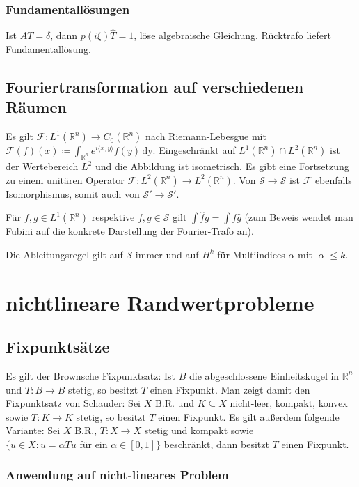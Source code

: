 \documentclass[11pt,a4paper]{scrartcl}
\newcommand{\R}{\mathbb{R}} %
\newcommand{\Sc}{\mathcal{S}}
\newcommand{\F}{\mathcal{F}}
\theoremstyle{plain}
\theoremstyle{definition}
\theoremstyle{remark}
\begin{document}
\subsubsection{Fundamentallösungen}

Ist $AT=\delta$, dann $p(i\xi)\hat T = 1$, löse algebraische Gleichung. Rücktrafo liefert Fundamentallösung.

\subsection{Fouriertransformation auf verschiedenen Räumen}

Es gilt $\F: L^1(\R^n) \to C_0(\R^n)$ nach Riemann-Lebesgue mit $\F(f)(x)\coloneqq \int_{\R^n} e^{i\langle x,y \rangle}f(y) \, \mathrm{dy}$. Eingeschränkt auf $L^1(\R^n) \cap L^2(\R^n)$ ist der Wertebereich $L^2$ und die Abbildung ist isometrisch. Es gibt eine Fortsetzung zu einem unitären Operator $\F: L^2(\R^n)\to L^2(\R^n)$. Von $\Sc\to \Sc$ ist $\F$ ebenfalls Isomorphismus, somit auch von $\Sc'\to \Sc'$.

Für $f,g\in L^1(\R^n)$ respektive $f,g\in \Sc$ gilt $\int \hat f g = \int f \hat g$ (zum Beweis wendet man Fubini auf die konkrete Darstellung der Fourier-Trafo an).

Die Ableitungsregel gilt auf $\Sc$ immer und auf $H^k$ für Multiindices $\alpha$ mit $|\alpha| \leq k$.

\section{nichtlineare Randwertprobleme}

\subsection{Fixpunktsätze}

Es gilt der Brownsche Fixpunktsatz: Ist $B$ die abgeschlossene Einheitskugel in $\R^n$ und $T:B\to B$ stetig, so besitzt $T$ einen Fixpunkt. Man zeigt damit den Fixpunktsatz von Schauder: Sei $X$ B.R. und $K\subseteq X$ nicht-leer, kompakt, konvex sowie $T:K\to K$ stetig, so besitzt $T$ einen Fixpunkt. Es gilt außerdem folgende Variante: Sei $X$ B.R., $T:X\to X$ stetig und kompakt sowie $\{ u\in X: u = \alpha Tu \text{ für ein } \alpha \in [0,1]\}$ beschränkt, dann besitzt $T$ einen Fixpunkt.

\subsubsection{Anwendung auf nicht-lineares Problem}
\end{document}
